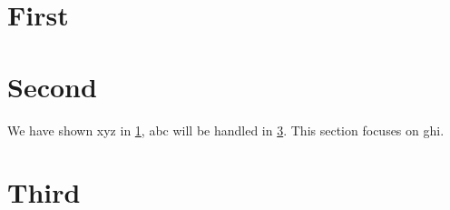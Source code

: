 \documentclass{scrartcl}
\newcommand{\ultracref}[1]{\cref{#1}}
\begin{document}
  \section{First}
  \label{sec:first}

  \section{Second}
  \label{sec:second}
  We have shown xyz in \ultracref{sec:first},
  abc will be handled in \ultracref{sec:third}.
  This section focuses on ghi.

  \section{Third}
  \label{sec:third}
\end{document}
